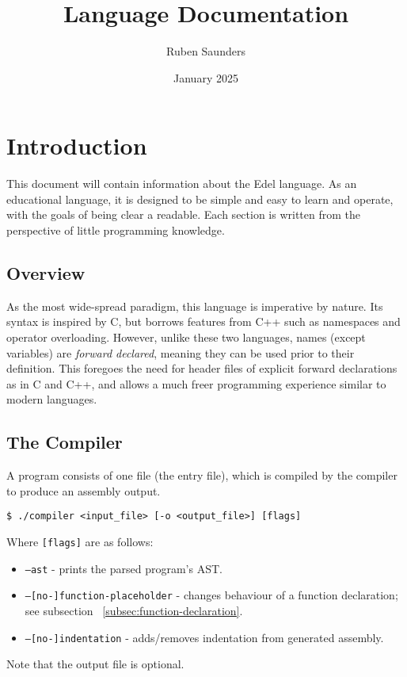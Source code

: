 \documentclass{article}
\title{Language Documentation}
\author{Ruben Saunders}
\date{January 2025}
\begin{document}
    \maketitle
    \tableofcontents

    \newpage

    \section{Introduction}\label{sec:introduction}

    This document will contain information about the Edel language.
    As an educational language, it is designed to be simple and easy to learn and operate, with the goals of being clear a readable.
    Each section is written from the perspective of little programming knowledge.

    \subsection{Overview}\label{subsec:overview}

    As the most wide-spread paradigm, this language is imperative by nature.
    Its syntax is inspired by C, but borrows features from C++ such as namespaces and operator overloading.
    However, unlike these two languages, names (except variables) are \textit{forward declared}, meaning they can be used prior to their definition.
    This foregoes the need for header files of explicit forward declarations as in C and C++, and allows a much freer programming experience similar to modern languages.


    \subsection{The Compiler}\label{subsec:the-compiler}

    A program consists of one file (the entry file), which is compiled by the compiler to produce an assembly output.

    \medskip
    \begin{lstlisting}[style=bashconsole]
$ ./compiler <input_file> [-o <output_file>] [flags]
    \end{lstlisting}
    \medskip

    Where \texttt{[flags]} are as follows:
    \begin{itemize}
        \item \texttt{--ast} - prints the parsed program's AST.
        \item \texttt{--[no-]function-placeholder} - changes behaviour of a function declaration; see subsection ~\ref{subsec:function-declaration}.
        \item \texttt{--[no-]indentation} - adds/removes indentation from generated assembly.
    \end{itemize}
    Note that the output file is optional.
\end{document}
